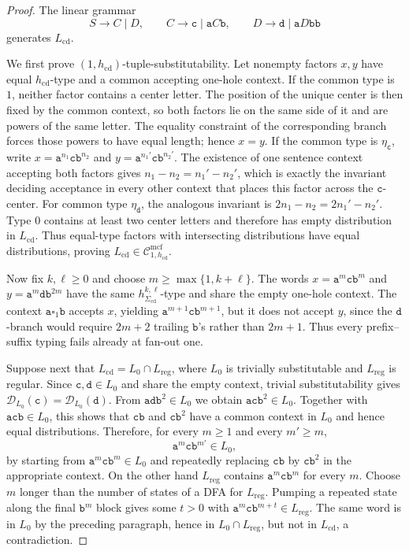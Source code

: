 \documentclass[11pt]{article}
\numberwithin{equation}{section}
\theoremstyle{plain}
\theoremstyle{definition}
\theoremstyle{remark}
\newcommand{\Cmcf}[2]{\mathcal{C}^{\mathrm{mcf}}_{#1,#2}}
\newcommand{\D}{\mathcal{D}}
\newcommand{\blank}{\square}
\begin{document}
\begin{proof}
The linear grammar
\[
  S\to C\mid D,
  \qquad C\to\mathtt c\mid\mathtt a C\mathtt b,
  \qquad D\to\mathtt d\mid\mathtt a D\mathtt b\mathtt b
\]
generates $L_{\mathrm{cd}}$.

We first prove $(1,h_{\mathrm{cd}})$-tuple-substitutability.  Let nonempty factors
$x,y$ have equal $h_{\mathrm{cd}}$-type and a common accepting one-hole context.  If
the common type is $1$, neither factor contains a center letter.  The position
of the unique center is then fixed by the common context, so both factors lie
on the same side of it and are powers of the same letter.  The equality
constraint of the corresponding branch forces those powers to have equal
length; hence $x=y$.  If the common type is $\eta_{\mathtt c}$, write
$x=\mathtt a^{n_1}\mathtt c\mathtt b^{n_2}$ and
$y=\mathtt a^{n_1'}\mathtt c\mathtt b^{n_2'}$.  The existence of one sentence context accepting both factors gives
$n_1-n_2=n_1'-n_2'$, which is exactly the invariant deciding acceptance in every
other context that places this factor across the $\mathtt c$-center.  For
common type $\eta_{\mathtt d}$, the analogous invariant is $2n_1-n_2=2n_1'-n_2'$.  Type $0$
contains at least two center letters and therefore has empty distribution in
$L_{\mathrm{cd}}$.  Thus equal-type factors with intersecting distributions have equal
distributions, proving $L_{\mathrm{cd}}\in\Cmcf{1}{h_{\mathrm{cd}}}$.

Now fix $k,\ell\ge0$ and choose
$m\ge\max\{1,k+\ell\}$.  The words
$x=\mathtt a^m\mathtt c\mathtt b^m$ and
$y=\mathtt a^m\mathtt d\mathtt b^{2m}$ have the same
$h_{\Sigma_{\mathrm{cd}}}^{k,\ell}$-type and share the empty one-hole
context.  The context $\mathtt a\blank_1\mathtt b$ accepts $x$, yielding
$\mathtt a^{m+1}\mathtt c\mathtt b^{m+1}$, but it does not accept $y$, since
the $\mathtt d$-branch would require $2m+2$ trailing $\mathtt b$'s rather
than $2m+1$.  Thus every prefix--suffix typing fails already at fan-out one.

Suppose next that $L_{\mathrm{cd}}=L_0\cap L_{\mathrm{reg}}$, where $L_0$ is trivially
substitutable and $L_{\mathrm{reg}}$ is regular.  Since $\mathtt c,\mathtt d\in L_0$ and
share the empty context, trivial substitutability gives
$\D_{L_0}(\mathtt c)=\D_{L_0}(\mathtt d)$.  From
$\mathtt a\mathtt d\mathtt b^2\in L_0$ we obtain
$\mathtt a\mathtt c\mathtt b^2\in L_0$.  Together with
$\mathtt a\mathtt c\mathtt b\in L_0$, this shows that
$\mathtt c\mathtt b$ and $\mathtt c\mathtt b^2$ have a common context in
$L_0$ and hence equal distributions.  Therefore, for every $m\ge1$ and every
$m'\ge m$,
\[
  \mathtt a^m\mathtt c\mathtt b^{m'}\in L_0,
\]
by starting from $\mathtt a^m\mathtt c\mathtt b^m\in L_0$ and repeatedly
replacing $\mathtt c\mathtt b$ by $\mathtt c\mathtt b^2$ in the appropriate
context.  On the other hand $L_{\mathrm{reg}}$ contains
$\mathtt a^m\mathtt c\mathtt b^m$ for every $m$.  Choose $m$ longer than the
number of states of a DFA for $L_{\mathrm{reg}}$.  Pumping a repeated state along the final
$\mathtt b^m$ block gives some $t>0$ with
$\mathtt a^m\mathtt c\mathtt b^{m+t}\in L_{\mathrm{reg}}$.  The same word is in $L_0$ by
the preceding paragraph, hence in $L_0\cap L_{\mathrm{reg}}$, but not in $L_{\mathrm{cd}}$, a
contradiction.


\end{proof}
\end{document}
